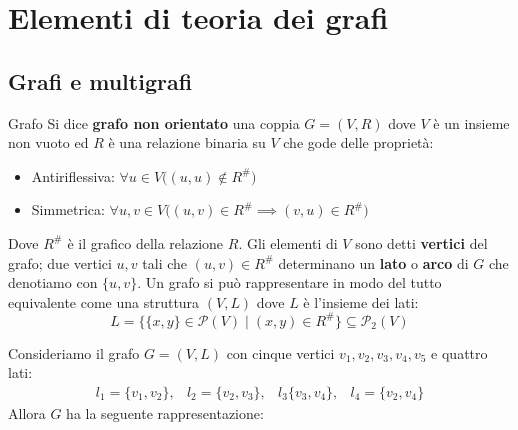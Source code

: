 \chapter{Elementi di teoria dei grafi}\label{chapter:grafi}
\section{Grafi e multigrafi}
\begin{defbox}{Grafo}
    Si dice \textbf{grafo non orientato} una coppia $G=(V,R)$ dove $V$ è un insieme non vuoto ed $R$ è una relazione binaria su $V$ che gode delle proprietà:
    \begin{itemize}
        \item Antiriflessiva: $\forall u \in V \bigl((u,u) \notin R^{\#}\bigr)$
        \item Simmetrica: $\forall u,v \in V \bigl((u,v) \in R^{\#} \implies (v,u) \in R^{\#}\bigr)$
    \end{itemize}
    Dove $R^{\#}$ è il grafico della relazione $R$. Gli elementi di $V$ sono detti \textbf{vertici} del grafo; due vertici $u,v$ tali che $(u,v)\in R^{\#}$ determinano un \textbf{lato} o \textbf{arco} di $G$ che denotiamo con $\{u,v\}$. Un grafo si può rappresentare in modo del tutto equivalente come una struttura $(V,L)$ dove $L$ è l'insieme dei lati:
    \begin{equation}
        L = \{ \{x,y\} \in \mathcal{P}(V) \; | \; (x,y) \in R^{\#}\} \subseteq \mathcal{P}_{2}(V)
    \end{equation}
\end{defbox}

\begin{example}
    Consideriamo il grafo $G=(V,L)$ con cinque vertici $v_{1},v_{2},v_{3},v_{4},v_{5}$ e quattro lati:
   \begin{displaymath}
    \begin{array}{llll}
        l_{1}= \{v_{1},v_{2}\}, & l_{2} = \{v_{2},v_{3}\}, & l_{3}\{v_{3},v_{4}\}, & l_{4}=\{v_{2},v_{4}\}
    \end{array}
   \end{displaymath}
    Allora $G$ ha la seguente rappresentazione:
    \begin{center}
    \label{fig:grafo}
    \end{center}
\end{example}

